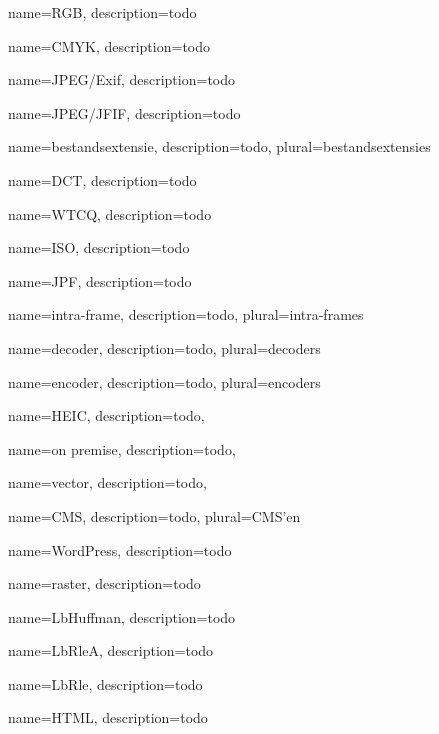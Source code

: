 {
	name={RGB},
	description={todo}
}

{
	name={CMYK},
	description={todo}
}

{
	name={JPEG/Exif},
	description={todo}
}

{
	name={JPEG/JFIF},
	description={todo}
}

{
	name={bestandsextensie},
	description={todo},
	plural={bestandsextensies}
}

{
	name={DCT},
	description={todo}
}

{
	name={WTCQ},
	description={todo}
}

{
	name={ISO},
	description={todo}
}

{
	name={JPF},
	description={todo}
}

{
	name={intra-frame},
	description={todo},
	plural={intra-frames}
}

{
	name={decoder},
	description={todo},
	plural={decoders}
}

{
	name={encoder},
	description={todo},
	plural={encoders}
}

{
	name={HEIC},
	description={todo},
}

{
	name={on premise},
	description={todo},
}

{
	name={vector},
	description={todo},
}

{
	name={CMS},
	description={todo},
	plural={CMS'en}
}

{
	name={WordPress},
	description={todo}
}

{
	name={raster},
	description={todo}
}

{
	name={LbHuffman},
	description={todo}
}

{
	name={LbRleA},
	description={todo}
}

{
	name={LbRle},
	description={todo}
}

{
	name={HTML},
	description={todo}
}

